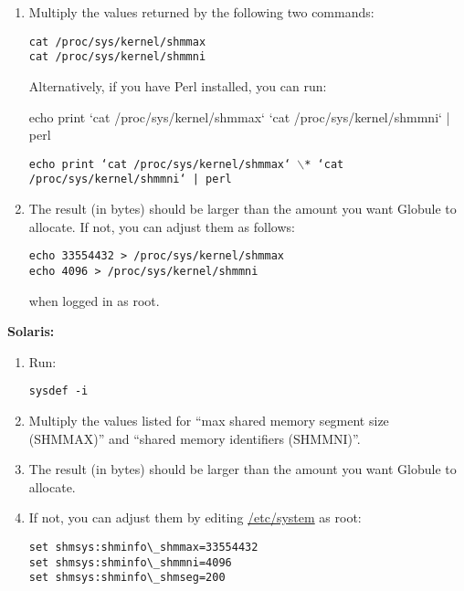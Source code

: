 \documentclass[10pt,a4paper]{article}
\makeatletter
\newenvironment{p}{\@open{P}{}}{\@close{P}}
\newenvironment{p}{}{\par}
\makeatother
\begin{document}
\begin{p}
\begin{enumerate}
\item Multiply the values returned by the following two commands:

\begin{Verbatim}
cat /proc/sys/kernel/shmmax
cat /proc/sys/kernel/shmmni
\end{Verbatim}

\begin{p}
  Alternatively, if you have Perl installed, you can run: 
\end{p}

\ifhevea{}%
\begin{rawhtml}echo print `cat /proc/sys/kernel/shmmax` \* `cat /proc/sys/kernel/shmmni` | perl  
\end{rawhtml}
\else
{\tt\footnotesize echo print `cat /proc/sys/kernel/shmmax` $\backslash$* `cat /proc/sys/kernel/shmmni` | perl}
\fi

\item The result (in bytes) should be larger than the amount you want
Globule to allocate. If not, you can adjust them as follows:

\begin{Verbatim}
echo 33554432 > /proc/sys/kernel/shmmax
echo 4096 > /proc/sys/kernel/shmmni
\end{Verbatim}

when logged in as root.
\end{enumerate}
\end{p}

\begin{p}
\textbf{Solaris:}
\end{p}

\begin{p}
\begin{enumerate}
\item Run:
\begin{Verbatim}
sysdef -i
\end{Verbatim}
\item Multiply the values listed for ``max shared memory segment size
(SHMMAX)'' and ``shared memory identifiers (SHMMNI)''.
\item The result (in bytes) should be larger than the amount you want
Globule to allocate.
\item If not, you can adjust them by editing \url{/etc/system} as root:

\begin{Verbatim}
set shmsys:shminfo\_shmmax=33554432
set shmsys:shminfo\_shmmni=4096
set shmsys:shminfo\_shmseg=200
\end{Verbatim}
\end{enumerate}
\end{p}
\end{document}
